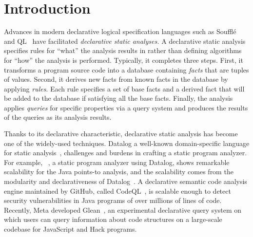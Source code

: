 \section{Introduction}
Advances in modern declarative logical specification languages such as
 Souffl\'{e}~\cite{souffle} and QL~\cite{ql2016} have facilitated
\emph{declarative static analyses.} A declarative static analysis specifies
rules for ``what'' the analysis results in rather than defining algorithms for
``how'' the analysis is performed.  Typically, it completes three steps.
First, it transforms a program source code into a database containing
\textit{facts} that are tuples of values.  Second, it derives new facts from
known facts in the database by applying {\it rules}.  Each rule specifies a set
of base facts and a derived fact that will be added to the database if
satisfying all the base facts.  Finally, the analysis applies {\it queries} for
specific properties via a query system and produces the results of the queries
as its analysis results.

Thanks to its declarative characteristic, declarative static analysis has
become one of the widely-used techniques.  Datalog  a well-known
domain-specific language for static analysis~\cite{doop, codequest, allen2015D,
allen2015stagedD, alpuente2010D, dawson1996D, naik2006D, reps1994D,
smaragdakis2014D, whaley2005D, scholz2016},  challenges and
burdens in crafting a static program analyzer.  For example, \doop~\cite{doop},
a static program analyzer using Datalog, shows remarkable scalability for the
Java points-to analysis, and the scalability comes from the modularity and
declarativeness of Datalog~\cite{doopWorkshop}.
 A declarative semantic code
analysis engine maintained by GitHub, called CodeQL~\cite{codeql}, is scalable
enough to detect security vulnerabilities in Java programs of over millions of
lines of code.  Recently, Meta developed Glean~\cite{glean}, an experimental
declarative query system on which users can query information about code
structures on a large-scale codebase for JavaScript and Hack programs.


